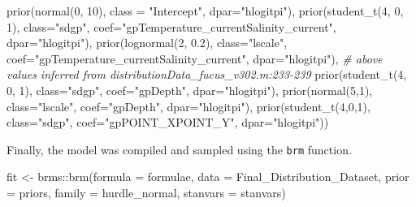 \documentclass[
  12pt,
  twoside]{book}
\newenvironment{Shaded}{\begin{snugshade}}{\end{snugshade}}
\newcommand{\AttributeTok}[1]{\textcolor[rgb]{0.77,0.63,0.00}{#1}}
\newcommand{\CommentTok}[1]{\textcolor[rgb]{0.56,0.35,0.01}{\textit{#1}}}
\newcommand{\DecValTok}[1]{\textcolor[rgb]{0.00,0.00,0.81}{#1}}
\newcommand{\FloatTok}[1]{\textcolor[rgb]{0.00,0.00,0.81}{#1}}
\newcommand{\FunctionTok}[1]{\textcolor[rgb]{0.00,0.00,0.00}{#1}}
\newcommand{\NormalTok}[1]{#1}
\newcommand{\OtherTok}[1]{\textcolor[rgb]{0.56,0.35,0.01}{#1}}
\newcommand{\SpecialCharTok}[1]{\textcolor[rgb]{0.00,0.00,0.00}{#1}}
\newcommand{\StringTok}[1]{\textcolor[rgb]{0.31,0.60,0.02}{#1}}
\theoremstyle{definition}
\theoremstyle{definition}
\theoremstyle{definition}
\theoremstyle{remark}
\begin{document}
\begin{Shaded}
\begin{Highlighting}[]
  \FunctionTok{prior}\NormalTok{(}\FunctionTok{normal}\NormalTok{(}\DecValTok{0}\NormalTok{, }\DecValTok{10}\NormalTok{), }\AttributeTok{class =} \StringTok{"Intercept"}\NormalTok{, }\AttributeTok{dpar=}\StringTok{"hlogitpi"}\NormalTok{),}
  \FunctionTok{prior}\NormalTok{(}\FunctionTok{student\_t}\NormalTok{(}\DecValTok{4}\NormalTok{, }\DecValTok{0}\NormalTok{, }\DecValTok{1}\NormalTok{), }\AttributeTok{class=}\StringTok{"sdgp"}\NormalTok{, }
        \AttributeTok{coef=}\StringTok{"gpTemperature\_currentSalinity\_current"}\NormalTok{, }\AttributeTok{dpar=}\StringTok{"hlogitpi"}\NormalTok{),}
  \FunctionTok{prior}\NormalTok{(}\FunctionTok{lognormal}\NormalTok{(}\DecValTok{2}\NormalTok{, }\FloatTok{0.2}\NormalTok{), }\AttributeTok{class=}\StringTok{"lscale"}\NormalTok{, }
        \AttributeTok{coef=}\StringTok{"gpTemperature\_currentSalinity\_current"}\NormalTok{, }\AttributeTok{dpar=}\StringTok{"hlogitpi"}\NormalTok{), }
  \CommentTok{\# above values inferred from distributionData\_fucus\_v302.m:233{-}239}
  \FunctionTok{prior}\NormalTok{(}\FunctionTok{student\_t}\NormalTok{(}\DecValTok{4}\NormalTok{, }\DecValTok{0}\NormalTok{, }\DecValTok{1}\NormalTok{), }\AttributeTok{class=}\StringTok{"sdgp"}\NormalTok{, }\AttributeTok{coef=}\StringTok{"gpDepth"}\NormalTok{, }\AttributeTok{dpar=}\StringTok{"hlogitpi"}\NormalTok{),}
  \FunctionTok{prior}\NormalTok{(}\FunctionTok{normal}\NormalTok{(}\DecValTok{5}\NormalTok{,}\DecValTok{1}\NormalTok{), }\AttributeTok{class=}\StringTok{"lscale"}\NormalTok{, }\AttributeTok{coef=}\StringTok{"gpDepth"}\NormalTok{, }\AttributeTok{dpar=}\StringTok{"hlogitpi"}\NormalTok{),}
  \FunctionTok{prior}\NormalTok{(}\FunctionTok{student\_t}\NormalTok{(}\DecValTok{4}\NormalTok{,}\DecValTok{0}\NormalTok{,}\DecValTok{1}\NormalTok{), }\AttributeTok{class=}\StringTok{"sdgp"}\NormalTok{, }\AttributeTok{coef=}\StringTok{"gpPOINT\_XPOINT\_Y"}\NormalTok{, }
        \AttributeTok{dpar=}\StringTok{"hlogitpi"}\NormalTok{))}
\end{Highlighting}
\end{Shaded}

Finally, the model was compiled and sampled using the \texttt{brm} function.

\begin{Shaded}
\begin{Highlighting}[]
\NormalTok{fit }\OtherTok{\textless{}{-}}\NormalTok{ brms}\SpecialCharTok{::}\FunctionTok{brm}\NormalTok{(}\AttributeTok{formula =}\NormalTok{ formulae, }
                 \AttributeTok{data =}\NormalTok{ Final\_Distribution\_Dataset, }
                 \AttributeTok{prior =}\NormalTok{ priors,}
                 \AttributeTok{family =}\NormalTok{ hurdle\_normal, }
                 \AttributeTok{stanvars =}\NormalTok{ stanvars)}
\end{Highlighting}
\end{Shaded}
\end{document}
